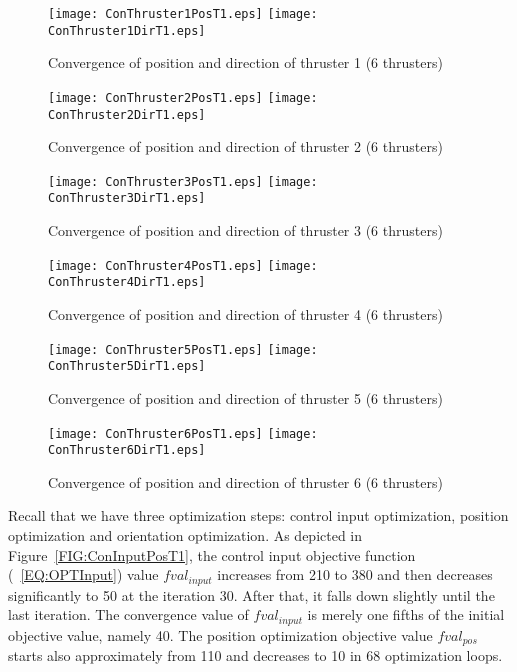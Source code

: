 \begin{figure}
\centering
\texttt{[image: ConThruster1PosT1.eps]}
\texttt{[image: ConThruster1DirT1.eps]}
\caption{Convergence of position and direction of thruster 1 (6 thrusters)}	
\label{FIG:ConThrusterT11}
\end{figure}
\begin{figure}
\centering
\texttt{[image: ConThruster2PosT1.eps]}
\texttt{[image: ConThruster2DirT1.eps]}
\caption{Convergence of position and direction of thruster 2 (6 thrusters)}	
\label{FIG:ConThrusterT21}
\end{figure}
\begin{figure}
\centering
\texttt{[image: ConThruster3PosT1.eps]}
\texttt{[image: ConThruster3DirT1.eps]}
\caption{Convergence of position and direction of thruster 3 (6 thrusters)}	
\label{FIG:ConThrusterT31}
\end{figure}
\begin{figure}
\centering
\texttt{[image: ConThruster4PosT1.eps]}
\texttt{[image: ConThruster4DirT1.eps]}
\caption{Convergence of position and direction of thruster 4 (6 thrusters)}	
\label{FIG:ConThrusterT41}
\end{figure}
\begin{figure}
\centering
\texttt{[image: ConThruster5PosT1.eps]}
\texttt{[image: ConThruster5DirT1.eps]}
\caption{Convergence of position and direction of thruster 5 (6 thrusters)}	
\label{FIG:ConThrusterT51}
\end{figure}
\begin{figure}
\centering
\texttt{[image: ConThruster6PosT1.eps]}
\texttt{[image: ConThruster6DirT1.eps]}
\caption{Convergence of position and direction of thruster 6 (6 thrusters)}	
\label{FIG:ConThrusterT61}
\end{figure}

Recall that we have three optimization steps: control input optimization, position optimization and orientation optimization. As depicted in Figure~\ref{FIG:ConInputPosT1}, the control input objective function (~\ref{EQ:OPTInput}) value $fval_{input}$ increases from 210 to 380 and then decreases significantly to 50 at the iteration 30. After that, it falls down slightly until the last iteration. The convergence value of $fval_{input}$ is merely one fifths of the initial objective value, namely 40. The position optimization objective value $fval_{pos}$ starts also approximately from 110 and decreases to 10 in 68 optimization loops.

